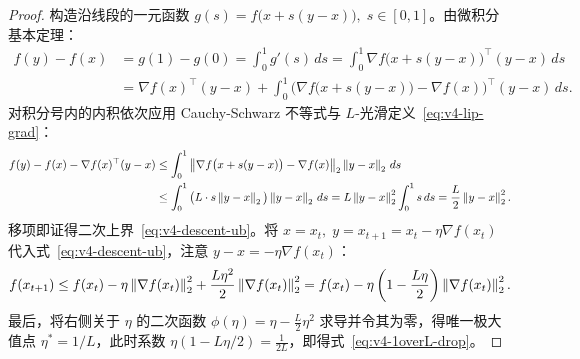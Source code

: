 \begin{proof}
构造沿线段的一元函数 $g(s) = f\big(x + s(y-x)\big),\; s \in [0, 1]$。由微积分基本定理：
\begin{align*}
  f(y) - f(x) &= g(1) - g(0) = \int_0^1 g'(s)\,ds = \int_0^1 \nabla f\big(x + s(y-x)\big)^\top (y - x)\,ds \\
  &= \nabla f(x)^\top (y-x) + \int_0^1 \Big(\nabla f\big(x + s(y-x)\big) - \nabla f(x)\Big)^\top (y - x)\,ds.
\end{align*}
对积分号内的内积依次应用 Cauchy-Schwarz 不等式与 $L$-光滑定义~\eqref{eq:v4-lip-grad}：
\begin{align*}
  f(y) - f(x) - \nabla f(x)^\top (y-x)
  &\le \int_0^1 \left\|\nabla f\big(x + s(y-x)\big) - \nabla f(x)\right\|_2 \left\|y - x\right\|_2\,ds \\
  &\le \int_0^1 \big(L \cdot s\left\|y - x\right\|_2\big) \left\|y - x\right\|_2\,ds
  = L\left\|y - x\right\|_2^2 \int_0^1 s\,ds = \frac{L}{2}\left\|y - x\right\|_2^2.
\end{align*}
移项即证得二次上界~\eqref{eq:v4-descent-ub}。将 $x = x_t,\; y = x_{t+1} = x_t - \eta \nabla f(x_t)$ 代入式~\eqref{eq:v4-descent-ub}，注意 $y - x = -\eta \nabla f(x_t)$：
\[
  f(x_{t+1}) \le f(x_t) - \eta\left\|\nabla f(x_t)\right\|_2^2 + \frac{L\eta^2}{2}\left\|\nabla f(x_t)\right\|_2^2
  = f(x_t) - \eta\left(1 - \frac{L\eta}{2}\right)\left\|\nabla f(x_t)\right\|_2^2.
\]
最后，将右侧关于 $\eta$ 的二次函数 $\phi(\eta) = \eta - \frac{L}{2}\eta^2$ 求导并令其为零，得唯一极大值点 $\eta^* = 1/L$，此时系数 $\eta(1 - L\eta/2) = \frac{1}{2L}$，即得式~\eqref{eq:v4-1overL-drop}。
\end{proof}

